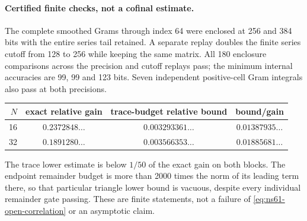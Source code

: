 \paragraph{Certified finite checks, not a cofinal estimate.}
The complete smoothed Grams through index 64 were enclosed at 256 and
384 bits with the entire series tail retained. A separate replay doubles
the finite series cutoff from 128 to 256 while keeping the same matrix.
All 180 enclosure comparisons across the precision and cutoff replays pass; the minimum internal accuracies are
99, 99 and 123 bits. Seven independent positive-cell Gram integrals
also pass at both precisions.
\begin{center}
\begin{tabular}{rccc}
\toprule
$N$ & exact relative gain & trace-budget relative bound & bound/gain\\
\midrule
16 & $0.2372848\ldots$ & $0.003293361\ldots$ & $0.01387935\ldots$\\
32 & $0.1891280\ldots$ & $0.003566353\ldots$ & $0.01885681\ldots$\\
\bottomrule
\end{tabular}
\end{center}
The trace lower estimate is below $1/50$ of the exact gain on both
blocks. The endpoint remainder budget is more than 2000 times the norm
of its leading term there, so that particular triangle lower bound is
vacuous, despite every individual remainder gate passing.
These are finite statements, not a failure of
\eqref{eq:ns61-open-correlation} or an asymptotic claim.
